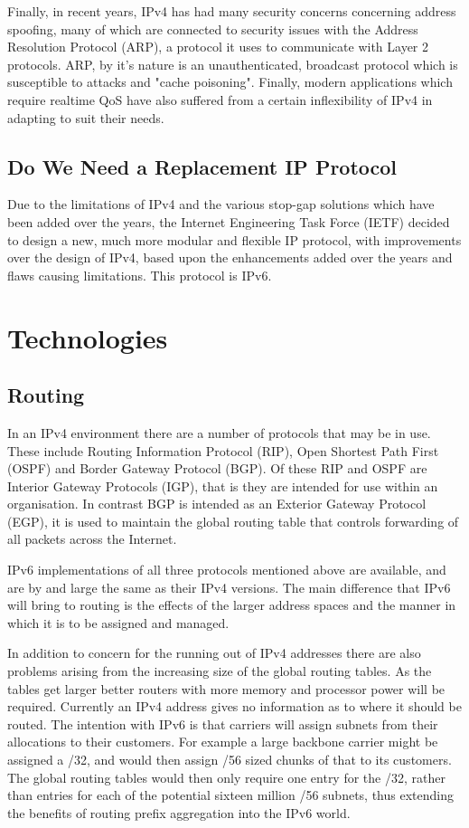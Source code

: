 \documentclass[a4paper,12pt]{article}
\begin{document}
Finally, in recent years, IPv4 has had many security concerns concerning
address spoofing, many of which are connected to security issues with
the Address Resolution Protocol (ARP), a protocol it uses to communicate
with Layer 2 protocols. ARP, by it's nature is an unauthenticated, 
broadcast protocol which is susceptible to attacks and "cache poisoning".
Finally, modern applications which require realtime QoS have also 
suffered from a certain inflexibility of IPv4 in adapting to suit their 
needs.

\subsection{Do We Need a Replacement IP Protocol}

Due to the limitations of IPv4 and the various stop-gap solutions which
have been added over the years, the Internet Engineering Task Force
(IETF) decided to design a new, much more modular and flexible IP
protocol, with improvements over the design of IPv4, based upon the
enhancements added over the years and flaws causing limitations. This
protocol is IPv6.

\section{Technologies}

\subsection{Routing}

In an IPv4 environment there are a number of protocols that may be in use. These
include Routing Information Protocol (RIP), Open Shortest Path First (OSPF) and
Border Gateway Protocol (BGP). Of these RIP and OSPF are Interior Gateway
Protocols (IGP), that is they are intended for use within an organisation. In
contrast BGP is intended as an Exterior Gateway Protocol (EGP), it is used to
maintain the global routing table that controls forwarding of all packets
across the Internet.


IPv6 implementations of all three protocols mentioned above are available, and
are by and large the same as their IPv4 versions. The main difference that IPv6
will bring to routing is the effects of the larger address spaces and the
manner in which it is to be assigned and managed. 


In addition to concern for the running out of IPv4 addresses there are also
problems arising from the increasing size of the global routing tables. As the
tables get larger better routers with more memory and processor power will be
required. Currently an IPv4 address gives no information as to where it should
be routed. The intention with IPv6 is that carriers will assign subnets from
their allocations to their customers. For example a large backbone carrier
might be assigned a /32, and would then assign /56 sized chunks of that to its
customers. The global routing tables would then only require one entry for the
/32, rather than entries for each of the potential sixteen million /56
subnets, thus extending the benefits of routing prefix aggregation into
the IPv6 world.
\end{document}
